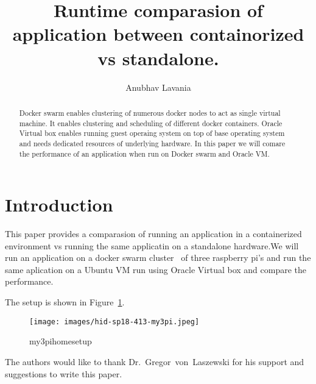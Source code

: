 
\title{Runtime comparasion of application between containorized vs standalone.}

\author{Anubhav Lavania}


\renewcommand{\shortauthors}{G. v. Laszewski}


\begin{abstract}
Docker swarm enables clustering of numerous docker nodes to act as
single virtual machine. It enables clustering and scheduling of
different docker containers. 
Oracle Virtual box enables running guest operaing system on top of
base operating system and needs dedicated resources of underlying
hardware.
In this paper we will comare the performance of an application when
run on Docker swarm and Oracle VM.

\end{abstract}



\maketitle


\section{Introduction}

This paper provides a comparasion of running an application in a
containerized environment vs running the same applicatin on a
standalone hardware.We will run an application on a docker swarm
cluster~\cite{hid-sp18-413-dockerswarm} of three raspberry pi's and
run the same aplication on a Ubuntu VM run using Oracle Virtual box and compare the performance.

The setup is shown in Figure~\ref{F:setup}.

\begin{figure}[!ht]
  \centering\texttt{[image: images/hid-sp18-413-my3pi.jpeg]}
  \caption{my3pihomesetup}\label{F:setup}
\end{figure}


\begin{acks}

  The authors would like to thank Dr.~Gregor~von~Laszewski for his
  support and suggestions to write this paper.

\end{acks}


 

